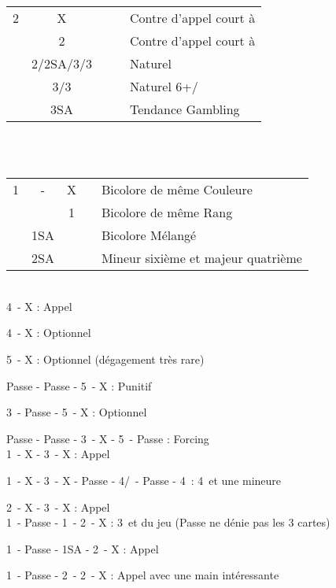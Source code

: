 \documentclass[a4paper, oneside, 11pt]{report}
\begin{document}
	\begin{tabular}{cccc|l}
	2\carreau & X &&& Contre d'appel court à \pique\\
	& 2\coeur &&& Contre d'appel court à \coeur\\
	& 2\pique/2SA/3\trefle/3\carreau &&& Naturel\\
	& 3\coeur/3\pique &&& Naturel 6+\coeur/\pique\\
	& 3SA &&& Tendance Gambling\\
	\end{tabular}\\\\
	
	\begin{tabular}{cccc|l}
	1\trefle & -  & X && Bicolore de même Couleure\\
	&& 1\carreau && Bicolore de même Rang\\
	& 1SA &&& Bicolore Mélangé\\
	& 2SA &&& Mineur sixième et majeur quatrième\\
	\end{tabular}\\
	
		4\coeur\ - X : Appel
		
		4\pique\ - X : Optionnel
		
		5\trefle\ - X : Optionnel (dégagement très rare)
		
		Passe - Passe - 5\trefle\ - X : Punitif
		
		3\trefle\ - Passe - 5\trefle\ - X : Optionnel
		
		Passe - Passe - 3\trefle\ - X - 5\trefle\ - Passe : Forcing\\
		
		1\pique\ - X - 3\pique\ - X : Appel
		
		1\pique\ - X - 3\pique\ - X - Passe - 4\trefle/\carreau\ - Passe - 4\coeur\ : 4\coeur\ et une mineure
		
		2\pique\ - X - 3\pique\ - X : Appel\\
		
		1\carreau\ - Passe - 1\coeur\ - 2\trefle\ - X : 3\coeur\ et du jeu (Passe ne dénie pas les 3 cartes)
		
		1\pique\ - Passe - 1SA - 2\trefle\ - X : Appel
		
		1\pique\ - Passe - 2\trefle\ - 2\coeur\ - X : Appel avec une main intéressante
		
\end{document}
